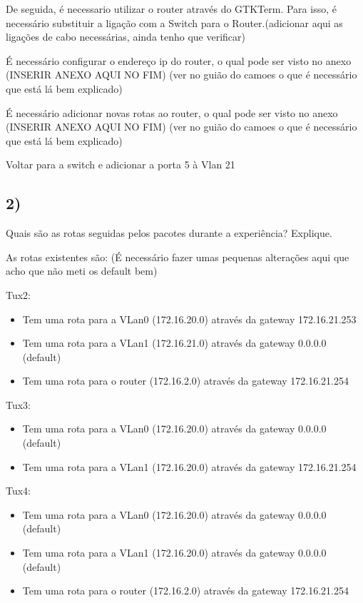 \documentclass[11pt]{article}
\begin{document}
De seguida, é necessario utilizar o router através do GTKTerm. Para isso, é necessário substituir a ligação com a Switch para o Router.(adicionar aqui as ligações de cabo necessárias, ainda tenho que verificar)

É necessário configurar o endereço ip do router, o qual pode ser visto no anexo (INSERIR ANEXO AQUI NO FIM) (ver no guião do camoes o que é necessário que está lá bem explicado)

É necessário adicionar novas rotas ao router, o qual pode ser visto no anexo (INSERIR ANEXO AQUI NO FIM) (ver no guião do camoes o que é necessário que está lá bem explicado)

Voltar para a switch e adicionar a porta 5 à Vlan 21


\subsection{2)} Quais são as rotas seguidas pelos pacotes durante a experiência? Explique.

As rotas existentes são:
(É necessário fazer umas pequenas alterações aqui que acho que não meti os default bem)

Tux2:
\begin{itemize}
\item Tem uma rota para a VLan0 (172.16.20.0) através da gateway 172.16.21.253
\item Tem uma rota para a VLan1 (172.16.21.0) através da gateway 0.0.0.0 (default)
\item Tem uma rota para o router (172.16.2.0) através da gateway 172.16.21.254

\end{itemize}

Tux3:
\begin{itemize}
\item Tem uma rota para a VLan0 (172.16.20.0) através da gateway 0.0.0.0 (default)
\item Tem uma rota para a VLan1 (172.16.20.0) através da gateway 172.16.21.254

\end{itemize}

Tux4:
\begin{itemize}
\item Tem uma rota para a VLan0 (172.16.20.0) através da gateway 0.0.0.0 (default)
\item Tem uma rota para a VLan1 (172.16.20.0) através da gateway 0.0.0.0 (default)
\item Tem uma rota para o router (172.16.2.0) através da gateway 172.16.21.254

\end{itemize}
\end{document}
